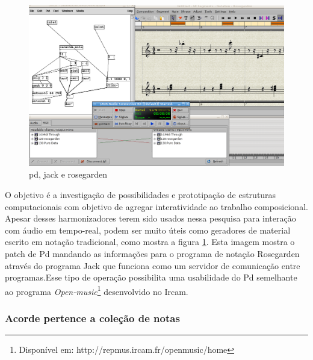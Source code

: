 \documentclass[draft]{ppgmus}
\begin{document}
\begin{figure}
\includegraphics[scale=.4]{harm5}
\caption{pd, jack e rosegarden}
\label{harm5}
\end{figure}

O objetivo é a investigação de possibilidades e prototipação de estruturas computacionais com 
objetivo de agregar interatividade ao trabalho composicional.  
	Apesar desses harmonizadores terem sido usados nessa pesquisa para interação com áudio em 
tempo-real, podem ser muito úteis como geradores de material escrito em notação tradicional, 
como mostra a figura \ref{harm5}. Esta imagem mostra o patch de Pd mandando as informações para o programa 
de notação Rosegarden através do programa Jack que funciona como um servidor de comunicação entre 
programas.Esse tipo de operação possibilita uma usabilidade do Pd semelhante ao programa \textit{Open-music}\footnote{Disponível em:
http://repmus.ircam.fr/openmusic/home}
desenvolvido no Ircam.


\subsubsection{Acorde pertence a coleção de notas}
\end{document}
